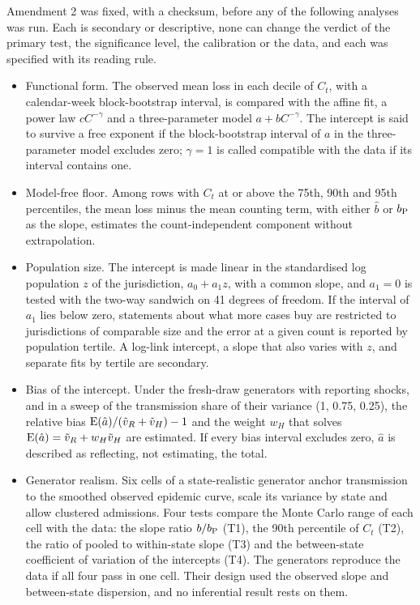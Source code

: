 Amendment 2 was fixed, with a checksum, before any of the following analyses was run. Each is secondary or descriptive, none can change the verdict of the primary test, the significance level, the calibration or the data, and each was specified with its reading rule.
\begin{itemize}
\item Functional form. The observed mean loss in each decile of $C_t$, with a calendar-week block-bootstrap interval, is compared with the affine fit, a power law $cC^{-\gamma}$ and a three-parameter model $a+bC^{-\gamma}$. The intercept is said to survive a free exponent if the block-bootstrap interval of $a$ in the three-parameter model excludes zero; $\gamma=1$ is called compatible with the data if its interval contains one.
\item Model-free floor. Among rows with $C_t$ at or above the 75th, 90th and 95th percentiles, the mean loss minus the mean counting term, with either $\hat b$ or $b_{\mathrm P}$ as the slope, estimates the count-independent component without extrapolation.
\item Population size. The intercept is made linear in the standardised log population $z$ of the jurisdiction, $a_0+a_1z$, with a common slope, and $a_1=0$ is tested with the two-way sandwich on 41 degrees of freedom. If the interval of $a_1$ lies below zero, statements about what more cases buy are restricted to jurisdictions of comparable size and the error at a given count is reported by population tertile. A log-link intercept, a slope that also varies with $z$, and separate fits by tertile are secondary.
\item Bias of the intercept. Under the fresh-draw generators with reporting shocks, and in a sweep of the transmission share of their variance (1, 0.75, 0.25), the relative bias $\operatorname{E}(\hat a)/(\tilde v_R+\tilde v_H)-1$ and the weight $w_H$ that solves $\operatorname{E}(\hat a)=\tilde v_R+w_H\tilde v_H$ are estimated. If every bias interval excludes zero, $\hat a$ is described as reflecting, not estimating, the total.
\item Generator realism. Six cells of a state-realistic generator anchor transmission to the smoothed observed epidemic curve, scale its variance by state and allow clustered admissions. Four tests compare the Monte Carlo range of each cell with the data: the slope ratio $b/b_{\mathrm P}$ (T1), the 90th percentile of $C_t$ (T2), the ratio of pooled to within-state slope (T3) and the between-state coefficient of variation of the intercepts (T4). The generators reproduce the data if all four pass in one cell. Their design used the observed slope and between-state dispersion, and no inferential result rests on them.

\end{itemize}
